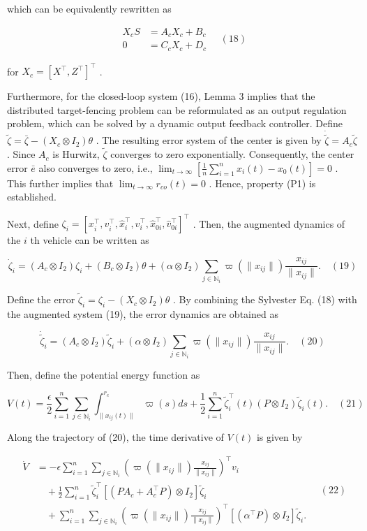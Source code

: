 which can be equivalently rewritten as

$$\begin{aligned} X_c S &= A_c X_c + B_c \\ 0 &= C_c X_c + D_c \end{aligned} \quad (18)$$

for  $X_c = [X^\top, Z^\top]^\top$ .

Furthermore, for the closed-loop system (16), Lemma 3 implies that the distributed target-fencing problem can be reformulated as an output regulation problem, which can be solved by a dynamic output feedback controller. Define  $\tilde{\zeta} = \bar{\zeta} - (X_c \otimes I_2)\theta$ . The resulting error system of the center is given by  $\dot{\tilde{\zeta}} = A_c \tilde{\zeta}$ . Since  $A_c$  is Hurwitz,  $\tilde{\zeta}$  converges to zero exponentially. Consequently, the center error  $\bar{e}$  also converges to zero, i.e.,  $\lim_{t \rightarrow \infty} [\frac{1}{n} \sum_{i=1}^n x_i(t) - x_0(t)] = 0$ . This further implies that  $\lim_{t \rightarrow \infty} r_{co}(t) = 0$ . Hence, property (P1) is established.

Next, define  $\zeta_i = [x_i^\top, v_i^\top, \hat{x}_i^\top, \hat{v}_i^\top, \hat{x}_{0i}^\top, \hat{v}_{0i}^\top]^\top$ . Then, the augmented dynamics of the  $i$ th vehicle can be written as

$$\dot{\zeta}_i = (A_c \otimes I_2)\zeta_i + (B_c \otimes I_2)\theta + (\alpha \otimes I_2) \sum_{j \in \mathbb{N}_i} \varpi(\|x_{ij}\|) \frac{x_{ij}}{\|x_{ij}\|}. \quad (19)$$

Define the error  $\tilde{\zeta}_i = \zeta_i - (X_c \otimes I_2)\theta$ . By combining the Sylvester Eq. (18) with the augmented system (19), the error dynamics are obtained as

$$\dot{\tilde{\zeta}}_i = (A_c \otimes I_2)\tilde{\zeta}_i + (\alpha \otimes I_2) \sum_{j \in \mathbb{N}_i} \varpi(\|x_{ij}\|) \frac{x_{ij}}{\|x_{ij}\|}. \quad (20)$$

Then, define the potential energy function as

$$V(t) = \frac{\epsilon}{2} \sum_{i=1}^n \sum_{j \in \mathbb{N}_i} \int_{\|x_{ij}(t)\|}^{r_c} \varpi(s) ds + \frac{1}{2} \sum_{i=1}^n \tilde{\zeta}_i^\top(t) (P \otimes I_2) \tilde{\zeta}_i(t). \quad (21)$$

Along the trajectory of (20), the time derivative of  $V(t)$  is given by

$$\begin{aligned} \dot{V} &= -\epsilon \sum_{i=1}^n \sum_{j \in \mathbb{N}_i} (\varpi(\|x_{ij}\|) \frac{x_{ij}}{\|x_{ij}\|})^\top v_i \\ &\quad + \frac{1}{2} \sum_{i=1}^n \tilde{\zeta}_i^\top [(PA_c + A_c^\top P) \otimes I_2] \tilde{\zeta}_i \\ &\quad + \sum_{i=1}^n \sum_{j \in \mathbb{N}_i} (\varpi(\|x_{ij}\|) \frac{x_{ij}}{\|x_{ij}\|})^\top [(\alpha^\top P) \otimes I_2] \tilde{\zeta}_i. \end{aligned} \quad (22)$$

